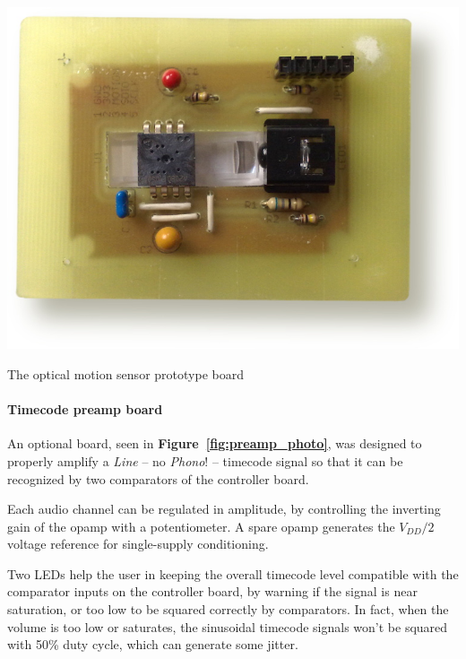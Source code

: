 \documentclass[a4paper,10pt]{article}
\makeatletter
\newenvironment{figurehere}{\def\@captype{figure}\vspace{2ex}}{\vspace{2ex}}
\newcommand{\citef}[1]{\textbf{Figure~\ref{#1}}}
\makeatother
\begin{document}
\begin{multicols}{2}
\begin{figurehere}
	\centering
	\includegraphics[keepaspectratio=true,width=\columnwidth]{images/sensor_photo.jpg}
	\caption{The optical motion sensor prototype board}
	\label{fig:sensor_photo}
\end{figurehere}


\paragraph{Timecode preamp board}
An optional board, seen in \citef{fig:preamp_photo}, was designed to properly
amplify a \emph{Line} -- no \emph{Phono}! -- timecode signal so that it can be
recognized by two comparators of the controller board.

Each audio channel can be regulated in amplitude, by controlling the inverting
gain of the opamp with a potentiometer. A spare opamp generates the $V_{DD}/2$
voltage reference for single-supply conditioning.

Two LEDs help the user in keeping the overall timecode level compatible with
the comparator inputs on the controller board, by warning if the signal is
near saturation, or too low to be squared correctly by comparators.
In fact, when the volume is too low or saturates, the sinusoidal timecode
signals won't be squared with 50\% duty cycle, which can generate some jitter.


\end{multicols}
\end{document}
